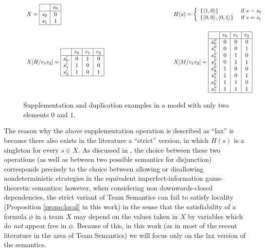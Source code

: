 \documentclass{article}
\theoremstyle{definition}
\begin{document}
\begin{figure}
\[
\begin{array}{l c l}
X = \begin{array}{|c | c|}
\hline
& v_0\\
\hline
s_0 & 0\\
s_1 & 1\\
\hline
\end{array}
&~~~~~~~~~~~~~~~~~~~~~~~~~~~~~~~&
H(s) = \left\{\begin{array}{l l}
\{\langle 1, 0\rangle \} & \text{ if } s = s_0\\
\{\langle 0, 0\rangle, \langle 0, 1\rangle\} & \text{ if } s = s_1
\end{array}
\right.\\
\\
X[H/v_1 v_2] = 
\begin{array}{| c | c | c | c |}
\hline 
& v_0 & v_1 & v_2\\
\hline
s'_0 & 0 & 1 & 0\\
s'_1 & 1 & 0 & 0\\
s'_2 & 1 & 0 & 1\\
\hline
\end{array}
&~~~~~~~~~~~~~~~~~~~~~~~~~~~~~~~&
X[M/v_1 v_2] = 
\begin{array}{| c | c | c | c |}
\hline 
& v_0 & v_1 & v_2\\
\hline
s''_0 & 0 & 0 & 0\\
s''_1 & 0 & 0 & 1\\
s''_2 & 0 & 1 & 0\\
s''_3 & 0 & 1 & 1\\
s''_4 & 1 & 0 & 0\\
s''_5 & 1 & 0 & 1\\
s''_6 & 1 & 1 & 0\\
s''_7 & 1 & 1 & 1\\
\hline
\end{array}
\end{array}
\]
\caption{Supplementation and duplication examples in a model with only two elements $0$ and $1$.}
\end{figure}
The reason why the above supplementation operation is described as ``lax'' is because there also exists in the literature a ``strict'' version, in which $H(s)$ is a singleton for every $s \in X$. As discussed in \cite{galliani12}, the choice between these two operations (as well as between two possible semantics for disjunction) corresponds precisely to the choice between allowing or disallowing nondeterministic strategies in the equivalent imperfect-information game-theoretic semantics; however, when considering non downwards-closed dependencies, the strict variant of Team Semantics can fail to satisfy locality (Proposition \ref{propo:local} in this work) in the sense that the satisfiability of a formula $\phi$ in a team $X$ may depend on the values taken in $X$ by variables which do \emph{not} appear free in $\phi$. Because of this, in this work (as in most of the recent literature in the area of Team Semantics) we will focus only on the lax version of the semantics. 
\end{document}
